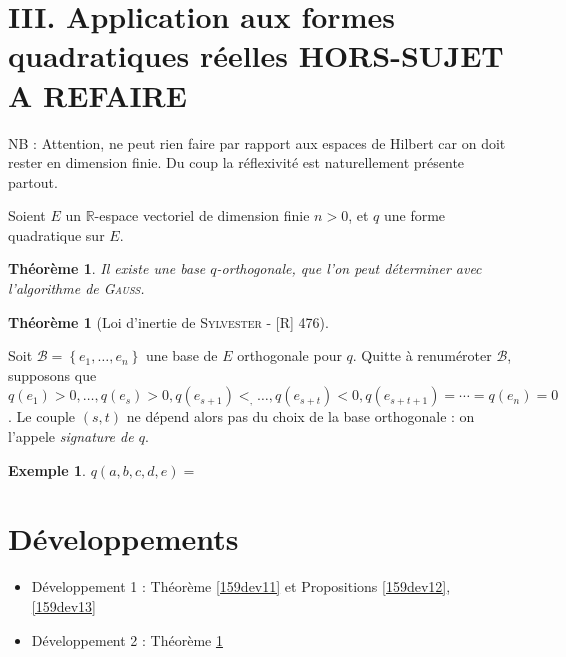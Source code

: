 \documentclass[10pt, a4paper, parskip=full, twoside, twocolumn]{report}
\newtheorem{theorem}[definition]{Théorème}
\newtheorem{example}[definition]{Exemple}
\newcommand{\IR}{\mathbb{R}}
\newcommand{\B}{\mathcal{B}}
\begin{document}
\section*{III. Application aux formes quadratiques réelles HORS-SUJET A REFAIRE}
NB : Attention, ne peut rien faire par rapport aux espaces de Hilbert car on doit rester en dimension finie.
Du coup la réflexivité est naturellement présente partout.

\textcolor{paragraphtext}{Soient $E$ un $\IR$-espace vectoriel de dimension finie $n>0$, et $q$ une forme quadratique sur $E$.}

\begin{theorem}
	Il existe une base $q$-orthogonale, que l'on peut déterminer avec l'algorithme de \textsc{Gauss}.
\end{theorem}


\begin{tcolorbox}[
    breakable, %
    colback=developpement, %
    colframe=gray!0!black, %
    boxrule=0pt, %
    arc=1mm, %
	boxsep=0pt,
	left=0pt, right=0pt, top=0pt, bottom=0pt
]
\begin{theorem}[Loi d'inertie de \textsc{Sylvester} - \textnormal{[R] 476}]
	\label{159dev2}
	
\end{theorem}
	Soit $\B=\left\{e_1,\dots, e_n\right\}$ une base de $E$ orthogonale pour $q$.
	Quitte à renuméroter $\B$, supposons que $q(e_1)>0,\dots, q(e_s)>0, q(e_{s+1})<_,\dots,q(e_{s+t})<0,q(e_{s+t+1}) = \cdots = q(e_n)=0$.
	Le couple $(s,t)$ ne dépend alors pas du choix de la base orthogonale : on l'appele \emph{signature de $q$}.
\begin{example}
	$q(a,b,c,d,e) =$
\end{example}
\end{tcolorbox}

\section*{Développements}
\begin{itemize}
	\item Développement 1 : Théorème \ref{159dev11} et Propositions \ref{159dev12}, \ref{159dev13}
	\item Développement 2 : Théorème \ref{159dev2}
\end{itemize}
\end{document}
